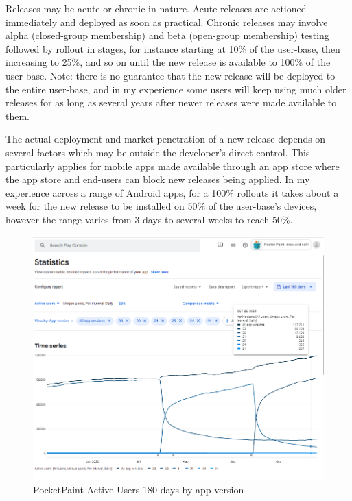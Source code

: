 Releases may be acute or chronic in nature. Acute releases are actioned immediately and deployed as soon as practical. Chronic releases may involve alpha (closed-group membership) and beta (open-group membership) testing followed by rollout in stages, for instance starting at 10\% of the user-base, then increasing to 25\%, and so on until the new release is available to 100\% of the user-base. Note: there is no guarantee that the new release will be deployed to the entire user-base, and in my experience some users will keep using much older releases for as long as several years after newer releases were made available to them. 

The actual deployment and market penetration of a new release depends on several factors which may be outside the developer's direct control. This particularly applies for mobile apps made available through an app store where the app store and end-users can block new releases being applied. In my experience across a range of Android apps, for a 100\% rollouts it takes about a week for the new release to be installed on 50\% of the user-base's devices, however the range varies from 3 days to several weeks to reach 50\%.  

\begin{figure}[htbp!]
    \centering
    \includegraphics[width=15.5cm]{images/android-vitals-screenshots/PocketPaint-ActiveUsers-180days-2020-10-29.png}
    \caption{PocketPaint Active Users 180 days by app version}
    \label{fig:pocketpaint-180d-active-users}
\end{figure}

